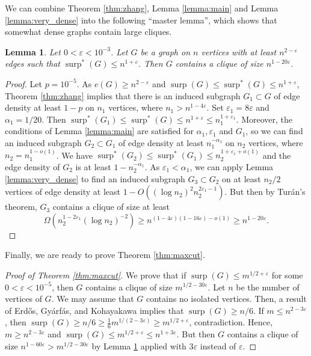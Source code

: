 \documentclass[11pt]{article}
\theoremstyle{plain}
\newtheorem{lemma}[theorem]{Lemma}
\theoremstyle{definition}
\DeclareMathOperator{\surp}{surp}
\newcommand{\eps}{\varepsilon}
\begin{document}
We can combine Theorem \ref{thm:zhang}, Lemma \ref{lemma:main} and Lemma \ref{lemma:very_dense} into the following ``master lemma'', which shows that somewhat dense graphs contain large cliques.

\begin{lemma}\label{lemma:master}
Let $0<\eps<10^{-3}$. Let $G$ be a graph on $n$ vertices  with at least $n^{2-\eps}$ edges such that $\surp^*(G)\leq n^{1+\eps}$. Then $G$ contains a clique of size $n^{1-20\eps}$.
\end{lemma}

\begin{proof}
 Let $p=10^{-5}$. As $e(G)\geq n^{2-\eps}$ and $\surp(G)\leq \surp^*(G)\leq n^{1+\eps}$, Theorem \ref{thm:zhang} implies that there is an induced subgraph $G_1\subset G$ of edge density at least $1-p$ on $n_1$ vertices, where $n_1>n^{1-4\eps}$. Set $\eps_1=8\eps$ and $\alpha_1=1/20$. Then $\surp^*(G_1)\leq \surp^*(G)\leq n^{1+\eps}\leq n_1^{1+\eps_1}$. Moreover, the conditions of Lemma \ref{lemma:main} are satisfied for $\alpha_1,\eps_1$ and $G_1$, so we can find an induced subgraph $G_2\subset G_1$ of edge density at least $n_1^{-\alpha_1}$ on $n_2$ vertices, where $n_2=n_1^{1-o(1)}$. We have $\surp^*(G_2)\leq \surp^*(G_1)\leq n_2^{1+\eps_1+o(1)}$ and the edge density of $G_2$ is at least $1-n_2^{-\alpha_1}$. As $\eps_1<\alpha_1$, we can apply Lemma \ref{lemma:very_dense} to find an induced subgraph $G_3\subset G_2$ on at least $n_2/2$ vertices of edge density at least $1-O((\log n_2)^2n_2^{2\eps_1-1})$.
But then by Tur\'an's theorem, $G_3$ contains a clique of size at least 
$$\Omega(n_2^{1-2\eps_1}(\log n_2)^{-2})\geq n^{(1-4\eps)(1-16\eps)-o(1)}\geq n^{1-20\eps}.$$
\end{proof}

Finally, we are ready to prove Theorem \ref{thm:maxcut}.

\begin{proof}[Proof of Theorem \ref{thm:maxcut}]
We prove that if $\surp(G)\leq m^{1/2+\eps}$ for some $0<\eps<10^{-5}$, then $G$ contains a clique of size $m^{1/2-30\eps}$. Let $n$ be the number of vertices of $G$. We may assume that $G$ contains no isolated vertices. Then, a result of Erd\H{o}s, Gy\'arf\'as, and Kohayakawa \cite{EGyK} implies that $\surp(G)\geq n/6$. If $m\leq n^{2-3\eps}$, then $\surp(G)\geq n/6\geq \frac{1}{6}m^{1/(2-3\eps)}\geq m^{1/2+\eps}$, contradiction. Hence, $m\geq n^{2-3\eps}$ and $\surp(G)\leq m^{1/2+\eps}\leq n^{1+3\eps}$. But then $G$ contains a clique of size $n^{1-60\eps}>m^{1/2-30\eps}$ by Lemma \ref{lemma:master} applied with $3\eps$ instead of $\eps$.
\end{proof}
\end{document}
